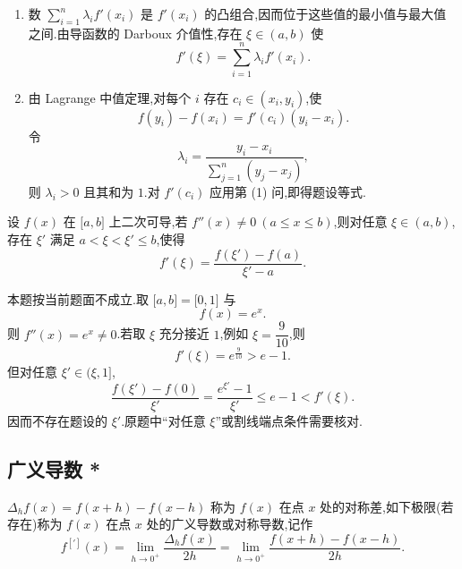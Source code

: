 \begin{solution}
    \begin{enumerate}
        \item 数 $\displaystyle\sum\limits_{i=1}^{n}\lambda_i f'(x_i)$ 是 $f'(x_i)$ 的凸组合,因而位于这些值的最小值与最大值之间.由导函数的 Darboux 介值性,存在 $\xi\in(a,b)$ 使
              \[
                  f'(\xi)=\sum\limits_{i=1}^{n}\lambda_i f'(x_i).
              \]
        \item 由 Lagrange 中值定理,对每个 $i$ 存在 $c_i\in(x_i,y_i)$,使
              \[
                  f(y_i)-f(x_i)=f'(c_i)(y_i-x_i).
              \]
              令
              \[
                  \lambda_i=\dfrac{y_i-x_i}{\displaystyle\sum\limits_{j=1}^{n}(y_j-x_j)},
              \]
              则 $\lambda_i>0$ 且其和为 $1$.对 $f'(c_i)$ 应用第 (1) 问,即得题设等式.
    \end{enumerate}
\end{solution}

\begin{example}
    设 $f(x)$ 在 $\lbrack a,b\rbrack$ 上二次可导,若 $f''(x)\neq0\ (a\leq x\leq b)$,则对任意 $\xi\in(a,b)$,存在 $\xi'$ 满足 $a<\xi<\xi'\leq b$,使得
    \[
        f'(\xi)=\dfrac{f(\xi')-f(a)}{\xi'-a}.
    \]
\end{example}
\exampleblank

\begin{solution}
    本题按当前题面不成立.取 $\lbrack a,b\rbrack=\lbrack0,1\rbrack$ 与
    \[
        f(x)=e^x.
    \]
    则 $f''(x)=e^x\neq0$.若取 $\xi$ 充分接近 $1$,例如 $\xi=\dfrac{9}{10}$,则
    \[
        f'(\xi)=e^{\frac{9}{10}}>e-1.
    \]
    但对任意 $\xi'\in(\xi,1\rbrack$,
    \[
        \dfrac{f(\xi')-f(0)}{\xi'}
        =\dfrac{e^{\xi'}-1}{\xi'}
        \leq e-1<f'(\xi).
    \]
    因而不存在题设的 $\xi'$.原题中“对任意 $\xi$”或割线端点条件需要核对.
\end{solution}



\subsection{广义导数 *}

\begin{definition}
    $\Delta_hf(x)=f(x+h)-f(x-h)$ 称为 $f(x)$ 在点 $x$ 处的对称差,如下极限(若存在)称为 $f(x)$ 在点 $x$ 处的广义导数或对称导数,记作
    \[
        f^{[\prime]}(x)
        =\lim\limits_{h\to0^+}\dfrac{\Delta_hf(x)}{2h}
        =\lim\limits_{h\to0^+}\dfrac{f(x+h)-f(x-h)}{2h}.
    \]
\end{definition}

